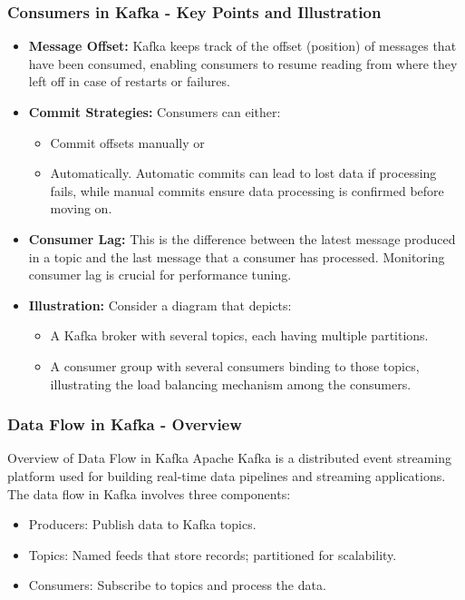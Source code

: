 \documentclass[aspectratio=169]{beamer}
\begin{document}
\begin{frame}[fragile]
    \frametitle{Consumers in Kafka - Key Points and Illustration}
    \begin{itemize}
        \item \textbf{Message Offset:}
        Kafka keeps track of the offset (position) of messages that have been consumed, enabling consumers to resume reading from where they left off in case of restarts or failures.
        
        \item \textbf{Commit Strategies:}
        Consumers can either:
        \begin{itemize}
            \item Commit offsets manually or 
            \item Automatically. Automatic commits can lead to lost data if processing fails, while manual commits ensure data processing is confirmed before moving on.
        \end{itemize}
        
        \item \textbf{Consumer Lag:}
        This is the difference between the latest message produced in a topic and the last message that a consumer has processed. Monitoring consumer lag is crucial for performance tuning.
        
        \item \textbf{Illustration:}
        Consider a diagram that depicts:
        \begin{itemize}
            \item A Kafka broker with several topics, each having multiple partitions.
            \item A consumer group with several consumers binding to those topics, illustrating the load balancing mechanism among the consumers.
        \end{itemize}
    \end{itemize}
\end{frame}

\begin{frame}[fragile]
    \frametitle{Data Flow in Kafka - Overview}
    \begin{block}{Overview of Data Flow in Kafka}
        Apache Kafka is a distributed event streaming platform used for building real-time data pipelines and streaming applications. The data flow in Kafka involves three components:
    \end{block}
    \begin{itemize}
        \item Producers: Publish data to Kafka topics.
        \item Topics: Named feeds that store records; partitioned for scalability.
        \item Consumers: Subscribe to topics and process the data.
    \end{itemize}
\end{frame}
\end{document}
